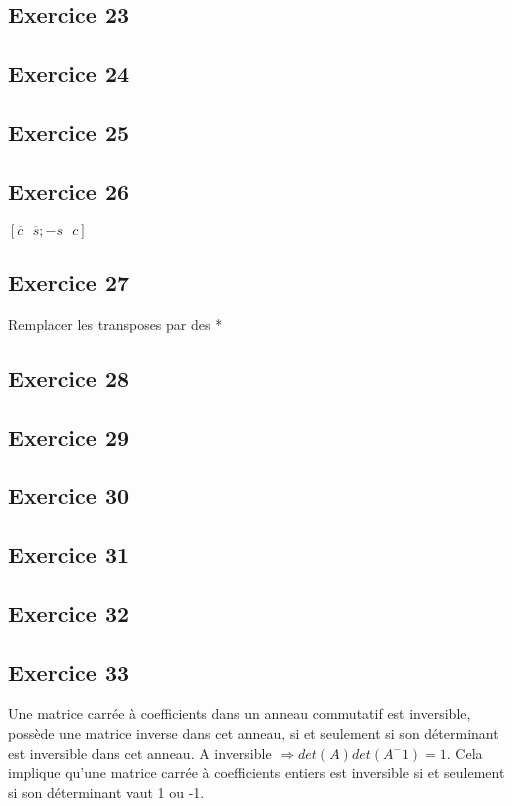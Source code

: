 \subsection*{Exercice 23}
\subsection*{Exercice 24}
\subsection*{Exercice 25}
\subsection*{Exercice 26}
$[ \overline{c} \text{     } \overline{s}; -s \text{     }  c]$
\subsection*{Exercice 27}
Remplacer les transposes par des *
\subsection*{Exercice 28}
\subsection*{Exercice 29}
\subsection*{Exercice 30}
\subsection*{Exercice 31}
\subsection*{Exercice 32}
\subsection*{Exercice 33}
Une matrice carrée à coefficients dans un anneau commutatif est inversible, possède une matrice inverse dans cet anneau, si et seulement si son déterminant est inversible dans cet anneau. A inversible $\Rightarrow det(A)det(A^-1) = 1$. Cela implique qu'une matrice carrée à coefficients entiers est inversible si et seulement si son déterminant vaut 1 ou -1.
